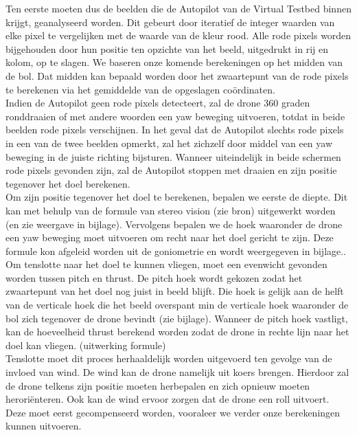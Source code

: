 \documentclass[tt]{penoverslag}
\begin{document}
Ten eerste moeten dus de beelden die de Autopilot van de Virtual Testbed binnen krijgt, geanalyseerd worden. Dit gebeurt door iteratief de integer waarden van elke pixel te vergelijken met de waarde van de kleur rood. Alle rode pixels worden bijgehouden door hun positie ten opzichte van het beeld, uitgedrukt in rij en kolom, op te slagen. We baseren onze komende berekeningen op het midden van de bol. Dat midden kan bepaald worden door het zwaartepunt van de rode pixels te berekenen via het gemiddelde van de opgeslagen co\"ordinaten.\\

Indien de Autopilot geen rode pixels detecteert, zal de drone 360 graden ronddraaien of met andere woorden een yaw beweging uitvoeren, totdat in beide beelden rode pixels verschijnen. In het geval dat de Autopilot slechts rode pixels in een van de twee beelden opmerkt, zal het zichzelf door middel van een yaw beweging in de juiste richting bijsturen. Wanneer uiteindelijk in beide schermen rode pixels gevonden zijn, zal de Autopilot stoppen met draaien en zijn positie tegenover het doel berekenen.\\

Om zijn positie tegenover het doel te berekenen, bepalen we eerste de diepte. Dit kan met behulp van de formule van stereo vision (zie bron) uitgewerkt worden (en zie weergave in bijlage). Vervolgens bepalen we de hoek waaronder de drone een yaw beweging moet uitvoeren om recht naar het doel gericht te zijn. Deze formule kon afgeleid worden uit de goniometrie en wordt weergegeven in bijlage.. Om tenslotte naar het doel te kunnen vliegen, moet een evenwicht gevonden worden tussen pitch en thrust. De pitch hoek wordt gekozen zodat het zwaartepunt van het doel nog juist in beeld blijft. Die hoek is gelijk aan de helft van de verticale hoek die het beeld overspant min de verticale hoek waaronder de bol zich tegenover de drone bevindt (zie bijlage). Wanneer de pitch hoek vastligt, kan de hoeveelheid thrust berekend worden zodat de drone in rechte lijn naar het doel kan vliegen. (uitwerking formule)\\

Tenslotte moet dit proces herhaaldelijk worden uitgevoerd ten gevolge van de invloed van wind. De wind kan de drone namelijk uit koers brengen. Hierdoor zal de drone telkens zijn positie moeten herbepalen en zich opnieuw moeten herori\"enteren. Ook kan de wind ervoor zorgen dat de drone een roll uitvoert. Deze moet eerst gecompenseerd worden, vooraleer we verder onze berekeningen kunnen uitvoeren.\\
\end{document}
